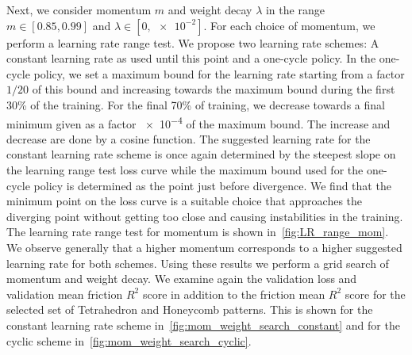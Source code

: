 Next, we consider momentum $m$ and weight decay $\lambda$ in the range $m \in
[0.85, 0.99]$ and $\lambda \in [0, \num{e-2}]$. For each choice of momentum, we
perform a learning rate range test. We propose two learning rate schemes: A
constant learning rate as used until this point and a one-cycle policy. In the
one-cycle policy, we set a maximum bound for the learning rate starting from a
factor $1/20$ of this bound and increasing towards the maximum bound during the
first 30\% of the training. For the final 70\% of training, we decrease towards
a final minimum given as a factor \num{e-4} of the maximum bound. The increase
and decrease are done by a cosine function. The suggested learning rate for the
constant learning rate scheme is once again determined by the steepest slope on
the learning range test loss curve while the maximum bound used for the
one-cycle policy is determined as the point just before divergence. We find that
the minimum point on the loss curve is a suitable choice that approaches the
diverging point without getting too close and causing instabilities in the
training. The learning rate range test for momentum is shown
in~\cref{fig:LR_range_mom}. We observe generally that a higher momentum
corresponds to a higher suggested learning rate for both schemes. Using these
results we perform a grid search of momentum and weight decay. We examine again
the validation loss and validation mean friction $R^2$ score in addition to the
friction mean $R^2$ score for the selected set of Tetrahedron and Honeycomb
patterns. This is shown for the constant learning rate scheme
in~\cref{fig:mom_weight_search_constant} and for the cyclic scheme
in~\cref{fig:mom_weight_search_cyclic}.


